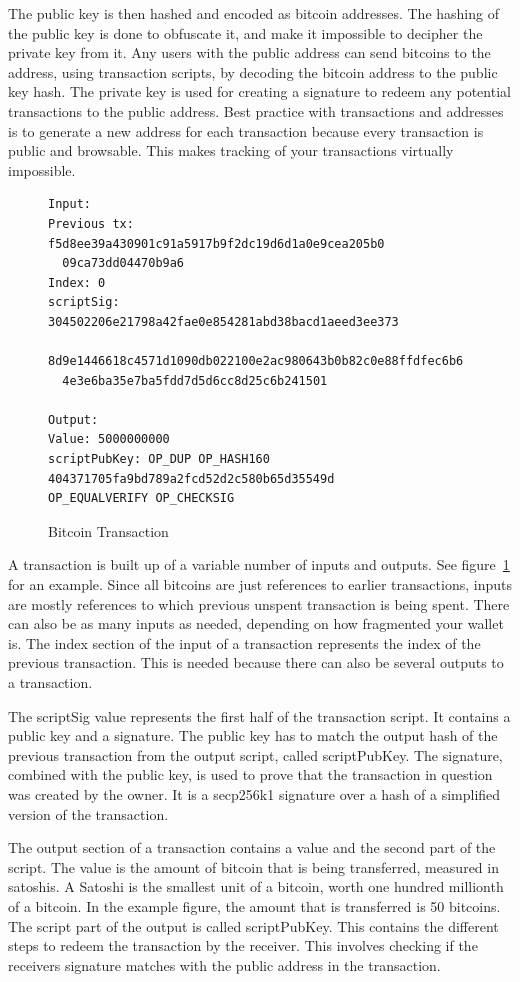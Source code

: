 \documentclass[11pt]{article}
\begin{document}
The public key is then hashed and encoded as bitcoin addresses. The hashing of the public key is done to obfuscate it, and make it impossible to decipher the private key from it. Any users with the public address can send bitcoins to the address, using transaction scripts, by decoding the bitcoin address to the public key hash. The private key is used for creating a signature to redeem any potential transactions to the public address. Best practice with transactions and addresses is to generate a new address for each transaction because every transaction is public and browsable. This makes tracking of your transactions virtually impossible. 

\begin{figure}[h!]
\begin{lstlisting}[numbers=none]
Input:
Previous tx: f5d8ee39a430901c91a5917b9f2dc19d6d1a0e9cea205b0
  09ca73dd04470b9a6
Index: 0
scriptSig: 304502206e21798a42fae0e854281abd38bacd1aeed3ee373
  8d9e1446618c4571d1090db022100e2ac980643b0b82c0e88ffdfec6b6
  4e3e6ba35e7ba5fdd7d5d6cc8d25c6b241501

Output:
Value: 5000000000
scriptPubKey: OP_DUP OP_HASH160 404371705fa9bd789a2fcd52d2c580b65d35549d
OP_EQUALVERIFY OP_CHECKSIG
 \end{lstlisting}
 \caption{Bitcoin Transaction}
 \label{fig:transaction}
\end{figure}

A transaction is built up of a variable number of inputs and outputs. See figure~\ref{fig:transaction}  for an example. Since all bitcoins are just references to earlier transactions, inputs are mostly references to which previous unspent transaction is being spent. There can also be as many inputs as needed, depending on how fragmented your wallet is. The index section of the input of a transaction represents the index of the previous transaction. This is needed because there can also be several outputs to a transaction.

The scriptSig value represents the first half of the transaction script. It contains a public key and a signature. The public key has to match the output hash of the previous transaction from the output script, called scriptPubKey. The signature, combined with the public key, is used to prove that the transaction in question was created by the owner. It is a secp256k1 signature over a hash of a simplified version of the transaction. 

The output section of a transaction contains a value and the second part of the script. The value is the amount of bitcoin that is being transferred, measured in satoshis. A Satoshi is the smallest unit of a bitcoin, worth one hundred millionth of a bitcoin. In the example figure, the amount that is transferred is 50 bitcoins. The script part of the output is called scriptPubKey. This contains the different steps to redeem the transaction by the receiver. This involves checking if the receivers signature matches with the public address in the transaction. 
\end{document}
